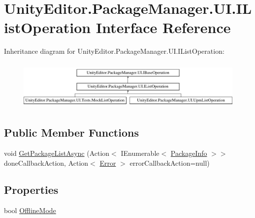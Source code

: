 \hypertarget{interface_unity_editor_1_1_package_manager_1_1_u_i_1_1_i_list_operation}{}\section{Unity\+Editor.\+Package\+Manager.\+U\+I.\+I\+List\+Operation Interface Reference}
\label{interface_unity_editor_1_1_package_manager_1_1_u_i_1_1_i_list_operation}
Inheritance diagram for Unity\+Editor.\+Package\+Manager.\+U\+I.\+I\+List\+Operation\+:\begin{figure}[H]
\begin{center}
\leavevmode
\includegraphics[height=2.448980cm]{interface_unity_editor_1_1_package_manager_1_1_u_i_1_1_i_list_operation}
\end{center}
\end{figure}
\subsection*{Public Member Functions}
\begin{DoxyCompactItemize}
\item 
void \mbox{\hyperlink{interface_unity_editor_1_1_package_manager_1_1_u_i_1_1_i_list_operation_af9786e05457b17b3cc3a5fdc4a5b42ae}{Get\+Package\+List\+Async}} (Action$<$ I\+Enumerable$<$ \mbox{\hyperlink{class_unity_editor_1_1_package_manager_1_1_u_i_1_1_package_info}{Package\+Info}} $>$$>$ done\+Callback\+Action, Action$<$ \mbox{\hyperlink{namespace_unity_editor_1_1_package_manager_1_1_u_i_ab1815eb3e48074893d9dc1dc99a4a32aa902b0d55fddef6f8d651fe1035b7d4bd}{Error}} $>$ error\+Callback\+Action=null)
\end{DoxyCompactItemize}
\subsection*{Properties}
\begin{DoxyCompactItemize}
\item 
bool \mbox{\hyperlink{interface_unity_editor_1_1_package_manager_1_1_u_i_1_1_i_list_operation_a617251544db29ab44bbee294c1ccce91}{Offline\+Mode}}
\end{DoxyCompactItemize}
